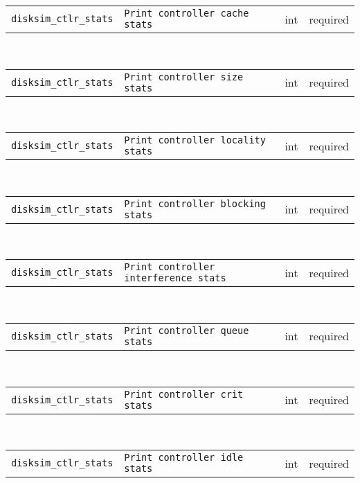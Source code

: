 \noindent 
\begin{tabular}{|p{1.5in}|p{3.5in}|p{0.5in}|p{0.5in}|}
\cline{1-4}
\texttt{disksim\_ctlr\_stats} & \texttt{Print controller cache stats} & int & required \\ 
\cline{1-4}
\end{tabular}\\ 
\noindent 
\begin{tabular}{|p{1.5in}|p{3.5in}|p{0.5in}|p{0.5in}|}
\cline{1-4}
\texttt{disksim\_ctlr\_stats} & \texttt{Print controller size stats} & int & required \\ 
\cline{1-4}
\end{tabular}\\ 
\noindent 
\begin{tabular}{|p{1.5in}|p{3.5in}|p{0.5in}|p{0.5in}|}
\cline{1-4}
\texttt{disksim\_ctlr\_stats} & \texttt{Print controller locality stats} & int & required \\ 
\cline{1-4}
\end{tabular}\\ 
\noindent 
\begin{tabular}{|p{1.5in}|p{3.5in}|p{0.5in}|p{0.5in}|}
\cline{1-4}
\texttt{disksim\_ctlr\_stats} & \texttt{Print controller blocking stats} & int & required \\ 
\cline{1-4}
\end{tabular}\\ 
\noindent 
\begin{tabular}{|p{1.5in}|p{3.5in}|p{0.5in}|p{0.5in}|}
\cline{1-4}
\texttt{disksim\_ctlr\_stats} & \texttt{Print controller interference stats} & int & required \\ 
\cline{1-4}
\end{tabular}\\ 
\noindent 
\begin{tabular}{|p{1.5in}|p{3.5in}|p{0.5in}|p{0.5in}|}
\cline{1-4}
\texttt{disksim\_ctlr\_stats} & \texttt{Print controller queue stats} & int & required \\ 
\cline{1-4}
\end{tabular}\\ 
\noindent 
\begin{tabular}{|p{1.5in}|p{3.5in}|p{0.5in}|p{0.5in}|}
\cline{1-4}
\texttt{disksim\_ctlr\_stats} & \texttt{Print controller crit stats} & int & required \\ 
\cline{1-4}
\end{tabular}\\ 
\noindent 
\begin{tabular}{|p{1.5in}|p{3.5in}|p{0.5in}|p{0.5in}|}
\cline{1-4}
\texttt{disksim\_ctlr\_stats} & \texttt{Print controller idle stats} & int & required \\ 
\cline{1-4}
\end{tabular}\\ 
